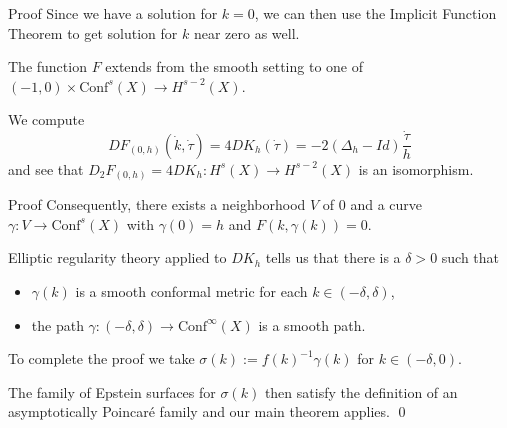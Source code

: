 \documentclass[professionalfont]{beamer}
\begin{document}


\begin{frame}{Proof}
Since we have a solution for $k = 0$, we can then use the Implicit Function Theorem to get solution for $k$ near zero as well. 
\newline

The function $F$ extends from the smooth setting to one of $(-1,0) \times \mathrm{Conf}^s(X) \to H^{s-2}(X)$. \pause
\newline

We compute
\[
DF_{(0,h)}(\dot{k},\dot{\tau}) = 4D K_h(\dot{\tau}) =-2(\Delta_h - Id)\frac{\dot{\tau}}{h}
\]
and see that $D_2F_{(0,h)} = 4D K_h: H^s(X) \to H^{s-2}(X)$ is an isomorphism.
\newline

\end{frame}



\begin{frame}{Proof}
Consequently, there exists a neighborhood $V$ of $0$ and a curve $\gamma : V \to \mathrm{Conf}^s(X)$ with $\gamma(0) = h$ and $F(k, \gamma(k)) = 0$. 
\newline \pause

Elliptic regularity theory applied to $D K_h$ tells us that there is a $\delta >0$ such that 

\begin{itemize}

	\item $\gamma(k)$ is a smooth conformal metric for each $k \in (-\delta,\delta)$, \pause
	
	\item the path $\gamma: (-\delta,\delta) \to \mathrm{Conf}^\infty(X)$ is a smooth path. \pause
	
\end{itemize}
\vspace{0.5cm}

To complete the proof we take $\sigma(k) := f(k)^{-1}\gamma(k)$ for $k \in (-\delta,0)$.
\newline

The family of Epstein surfaces for $\sigma(k)$ then satisfy the definition of an asymptotically Poincar\'e family and our main theorem applies.  \qed
\end{frame}


\end{document}
